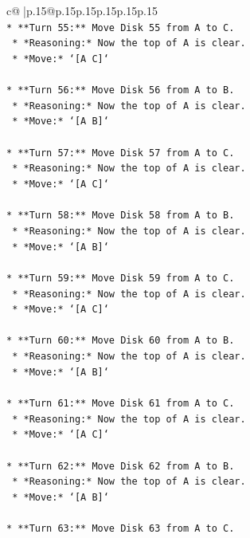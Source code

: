 \documentclass{article}
\begin{document}
{\begin{supertabular}{c@{$\;$}|p{.15\linewidth}@{}p{.15\linewidth}p{.15\linewidth}p{.15\linewidth}p{.15\linewidth}p{.15\linewidth}}
{{{\\ 
\texttt{*   **Turn 55:** Move Disk 55 from A to C.} \\
\texttt{    *   *Reasoning:* Now the top of A is clear.} \\
\texttt{    *   *Move:* `{[}A C{]}`} \\
\\ 
\texttt{*   **Turn 56:** Move Disk 56 from A to B.} \\
\texttt{    *   *Reasoning:* Now the top of A is clear.} \\
\texttt{    *   *Move:* `{[}A B{]}`} \\
\\ 
\texttt{*   **Turn 57:** Move Disk 57 from A to C.} \\
\texttt{    *   *Reasoning:* Now the top of A is clear.} \\
\texttt{    *   *Move:* `{[}A C{]}`} \\
\\ 
\texttt{*   **Turn 58:** Move Disk 58 from A to B.} \\
\texttt{    *   *Reasoning:* Now the top of A is clear.} \\
\texttt{    *   *Move:* `{[}A B{]}`} \\
\\ 
\texttt{*   **Turn 59:** Move Disk 59 from A to C.} \\
\texttt{    *   *Reasoning:* Now the top of A is clear.} \\
\texttt{    *   *Move:* `{[}A C{]}`} \\
\\ 
\texttt{*   **Turn 60:** Move Disk 60 from A to B.} \\
\texttt{    *   *Reasoning:* Now the top of A is clear.} \\
\texttt{    *   *Move:* `{[}A B{]}`} \\
\\ 
\texttt{*   **Turn 61:** Move Disk 61 from A to C.} \\
\texttt{    *   *Reasoning:* Now the top of A is clear.} \\
\texttt{    *   *Move:* `{[}A C{]}`} \\
\\ 
\texttt{*   **Turn 62:** Move Disk 62 from A to B.} \\
\texttt{    *   *Reasoning:* Now the top of A is clear.} \\
\texttt{    *   *Move:* `{[}A B{]}`} \\
\\ 
\texttt{*   **Turn 63:** Move Disk 63 from A to C.} \\
}}}
\end{supertabular}}
\end{document}
